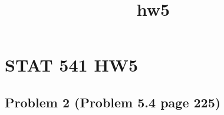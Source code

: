 \documentclass{article}
\title{hw5}
\begin{document}
    
    
    \maketitle
    
    

    

    \section{STAT 541 HW5}



    \subsection{Problem 2 (Problem 5.4 page 225)}
\end{document}
